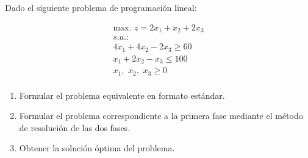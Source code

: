 Dado el siguiente problema de programación lineal:

\begin{equation}
\begin{split}
\mbox{max. } z = 2x_1 +  x_2 + 2x_3\\
s.a.:\\
4x_1 + 4x_2 - 2x_3 \geq 60\\
x_1 + 2x_2 -  x_3 \leq 100\\
x_1,\,\,x_2,\,\,x_3\geq 0\\
\end{split}
\end{equation}
\begin{enumerate}
    \item Formular el problema equivalente en formato estándar.

    \item Formular el problema correspondiente a la primera fase mediante el método de resolución de las dos fases.

    \item Obtener la solución óptima del problema.
    
\end{enumerate}





